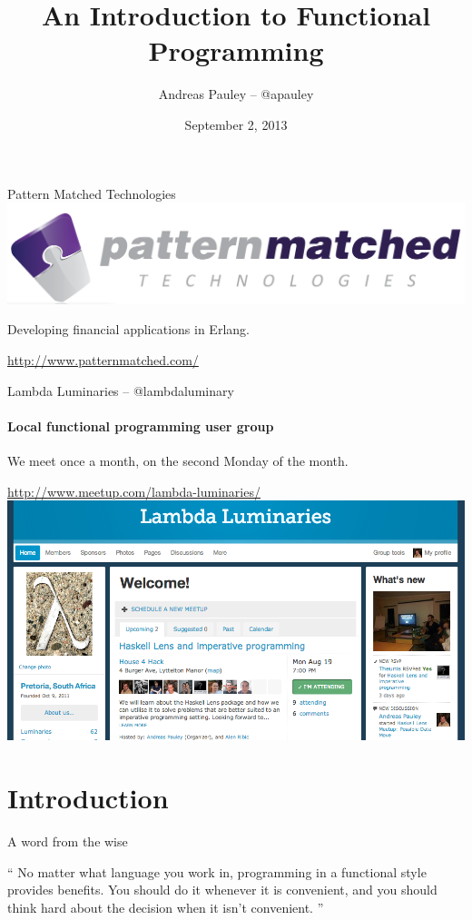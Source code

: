 \documentclass{beamer}
\title[Functional Programming]{An Introduction to Functional Programming}
\author{Andreas Pauley -- @apauley}
\institute{Pattern Matched Technologies\\Lambda Luminaries @lambdaluminary}
\date{September 2, 2013}
\begin{document}
\begin{frame}
  \titlepage
\end{frame}

\begin{frame}{Pattern Matched Technologies}
  \includegraphics[scale=0.21]{img/pmt-logo.png}

  Developing financial applications in Erlang.

  \url{http://www.patternmatched.com/}
\end{frame}

\begin{frame}{Lambda Luminaries -- @lambdaluminary}
  \framesubtitle{Local functional programming user group}
  We meet once a month, on the second Monday of the month.

  \url{http://www.meetup.com/lambda-luminaries/}
  \includegraphics[scale=0.3]{img/LambdaLuminariesScreenShot2013-08-09.png}
\end{frame}

\section{Introduction}

\begin{frame}{A word from the wise}
  \begin{exampleblock}{}
    {\Large ``
      No matter what language you work in, programming
      in a functional style provides benefits.
      You should do it whenever it is convenient, and you
      should think hard about the decision when it isn’t convenient.
      ''}
    \vskip5mm
    \hspace*{}
  \end{exampleblock}
\end{frame}
\end{document}
